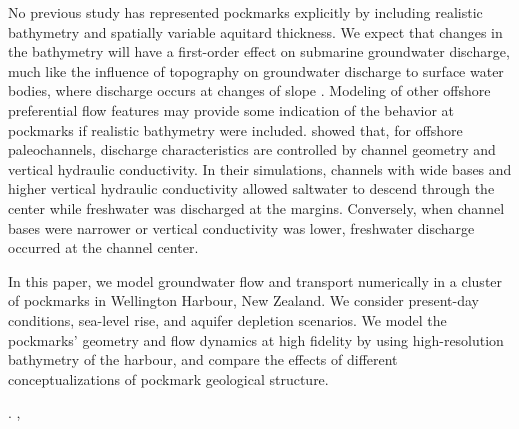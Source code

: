 \documentclass[draft, 10pt]{agujournal2019}
\begin{document}
No previous study has represented pockmarks explicitly by including realistic bathymetry and spatially variable aquitard thickness. We expect that changes in the bathymetry will have a first-order effect on submarine groundwater discharge, much like the influence of topography on groundwater discharge to surface water bodies, where discharge occurs at changes of slope \cite{winter_relation_1999}. Modeling of other offshore preferential flow features may provide some indication of the behavior at pockmarks if realistic bathymetry were included.  showed that, for offshore paleochannels, discharge characteristics are controlled by channel geometry and vertical hydraulic conductivity. In their simulations, channels with wide bases and higher vertical hydraulic conductivity allowed saltwater to descend through the center while freshwater was discharged at the margins. Conversely, when channel bases were narrower or vertical conductivity was lower, freshwater discharge occurred at the channel center.

In this paper, we model groundwater flow and transport numerically in a cluster of pockmarks in Wellington Harbour, New Zealand. We consider present-day conditions, sea-level rise, and aquifer depletion scenarios. We model the pockmarks' geometry and flow dynamics at high fidelity by using high-resolution bathymetry of the harbour, and compare the effects of different conceptualizations of pockmark geological structure.


\cite{michael_science_2017, ferguson_vulnerability_2012, zamrsky_global_2024}.  \cite{mendecki_saltwater_2025}, 
\end{document}
